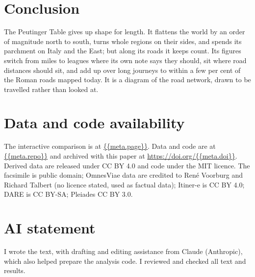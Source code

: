 \documentclass[11pt,a4paper]{article}
\begin{document}
\section{Conclusion}
The Peutinger Table gives up shape for length. It flattens the world by an order of magnitude north to south, turns whole regions on their sides, and spends its parchment on Italy and the East; but along its roads it keeps count. Its figures switch from miles to leagues where its own note says they should, sit where road distances should sit, and add up over long journeys to within a few per cent of the Roman roads mapped today. It is a diagram of the road network, drawn to be travelled rather than looked at.

\section*{Data and code availability}
The interactive comparison is at \url{{{meta.page}}}. Data and code are at \url{{{meta.repo}}} and archived with this paper at \url{https://doi.org/{{meta.doi}}}. Derived data are released under CC BY 4.0 and code under the MIT licence. The facsimile is public domain; OmnesViae data are credited to Ren\'e Voorburg and Richard Talbert (no licence stated, used as factual data); Itiner-e is CC BY 4.0; DARE is CC BY-SA; Pleiades CC BY 3.0.

\section*{AI statement}
I wrote the text, with drafting and editing assistance from Claude (Anthropic), which also helped prepare the analysis code. I reviewed and checked all text and results.
\end{document}
